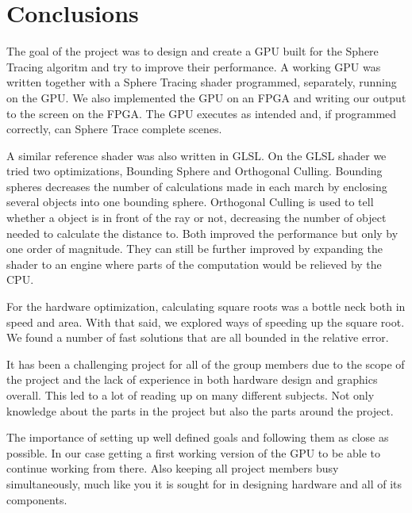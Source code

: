 \chapter{Conclusions}

	The goal of the project was to design and create a GPU built for the
	Sphere Tracing algoritm and try to improve their performance. A
	working GPU was written together with a Sphere Tracing shader
	programmed, separately, running on the GPU. We also implemented the
	GPU on an FPGA and writing our output to the screen on the FPGA. The
	GPU executes as intended and, if programmed correctly, can Sphere
	Trace complete scenes.
	
	A similar reference shader was also written in GLSL. On the GLSL
	shader we tried two optimizations, Bounding Sphere and Orthogonal
	Culling. Bounding spheres decreases the number of calculations made
	in each march by enclosing several objects into one bounding sphere.
	Orthogonal Culling is used to tell whether a object is in front of
	the ray or not, decreasing the number of object needed to calculate
	the distance to. Both improved the performance but only by one order
	of magnitude. They can still be further improved by expanding the
	shader to an engine where parts of the computation would be relieved
	by the CPU.
	
	For the hardware optimization, calculating square roots was a bottle neck 
	both in	speed and area. With that said, we explored ways of speeding up the	
	square root. We found a number of fast solutions that are all bounded
	in the relative error.
	
	It has been a challenging project for all of the group members due to
	the scope of the project and the lack of experience in both hardware
	design and graphics overall. This led to a lot of reading up on many
	different subjects. Not only knowledge about the parts in the project but 
	also the parts around the project.

	The importance of setting up well defined goals and following them as
	close as possible. In our case getting a first working version of the
	GPU to be able to continue working from there. Also keeping all
	project members busy simultaneously, much like you it is sought for in
	designing hardware and all of its components.
